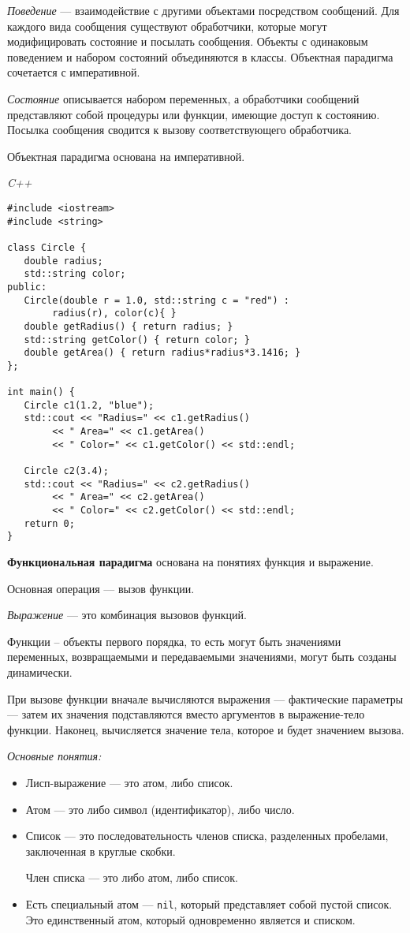 \textit{Поведение} --- взаимодействие с другими объектами посредством сообщений.
Для каждого вида сообщения существуют обработчики, которые могут модифицировать состояние и посылать сообщения.
Объекты с одинаковым поведением и набором состояний объединяются в классы.
Объектная парадигма сочетается с императивной.

\textit{Состояние} описывается набором переменных, а обработчики сообщений представляют собой процедуры или функции, имеющие доступ к состоянию.
Посылка сообщения сводится к вызову соответствующего обработчика.

Объектная парадигма основана на императивной.

\textit{C++}

\begin{lstlisting}[basicstyle=\ttfamily\small, frame=single]
#include <iostream>
#include <string>

class Circle {
   double radius;
   std::string color;
public:
   Circle(double r = 1.0, std::string c = "red") :
        radius(r), color(c){ }
   double getRadius() { return radius; }
   std::string getColor() { return color; }
   double getArea() { return radius*radius*3.1416; }
};

int main() {
   Circle c1(1.2, "blue");
   std::cout << "Radius=" << c1.getRadius()
        << " Area=" << c1.getArea()
        << " Color=" << c1.getColor() << std::endl;

   Circle c2(3.4);
   std::cout << "Radius=" << c2.getRadius()
        << " Area=" << c2.getArea()
        << " Color=" << c2.getColor() << std::endl;
   return 0;
}
\end{lstlisting}

\bigbreak
\textbf{Функциональная парадигма} основана на понятиях функция и выражение.

Основная операция --- вызов функции.

\textit{Выражение} --- это комбинация вызовов функций.

Функции -- объекты первого порядка, то есть могут быть значениями переменных, возвращаемыми и передаваемыми значениями, могут быть созданы динамически.

При вызове функции вначале вычисляются выражения --- фактические параметры --- затем их значения подставляются вместо аргументов в выражение-тело функции.
Наконец, вычисляется значение тела, которое и будет значением вызова.

\textit{Основные понятия:}
\begin{itemize}
    \item Лисп-выражение --- это атом, либо список.
    \item Атом --- это либо символ (идентификатор), либо число.
    \item Список --- это последовательность членов списка, разделенных пробелами, заключенная в круглые скобки.

    Член списка — это либо атом, либо список.
    \item Есть специальный атом --- \texttt{nil}, который представляет собой пустой список.
    Это единственный атом, который одновременно является и списком.
\end{itemize}


